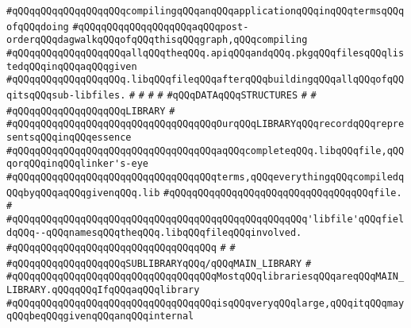 \verb|#qQQqqQQqqQQqqQQqqQQqcompilingqQQqanqQQqapplicationqQQqinqQQqtermsqQQqofqQQqdoing|\newline
\verb|#qQQqqQQqqQQqqQQqqQQqaqQQqpost-orderqQQqdagwalkqQQqofqQQqthisqQQqgraph,qQQqcompiling|\newline
\verb|#qQQqqQQqqQQqqQQqqQQqallqQQqtheqQQq.apiqQQqandqQQq.pkgqQQqfilesqQQqlistedqQQqinqQQqaqQQqgiven|\newline
\verb|#qQQqqQQqqQQqqQQqqQQq.libqQQqfileqQQqafterqQQqbuildingqQQqallqQQqofqQQqitsqQQqsub-libfiles.|\newline
\verb|#|\newline
\verb|#|\newline
\verb|#|\newline
\verb|#|\newline
\verb|#qQQqDATAqQQqSTRUCTURES|\newline
\verb|#|\newline
\verb|#|\newline
\verb|#qQQqqQQqqQQqqQQqqQQqLIBRARY|\newline
\verb|#|\newline
\verb|#qQQqqQQqqQQqqQQqqQQqqQQqqQQqqQQqqQQqOurqQQqLIBRARYqQQqrecordqQQqrepresentsqQQqinqQQqessence|\newline
\verb|#qQQqqQQqqQQqqQQqqQQqqQQqqQQqqQQqqQQqaqQQqcompleteqQQq.libqQQqfile,qQQqorqQQqinqQQqlinker's-eye|\newline
\verb|#qQQqqQQqqQQqqQQqqQQqqQQqqQQqqQQqqQQqterms,qQQqeverythingqQQqcompiledqQQqbyqQQqaqQQqgivenqQQq.lib|\newline
\verb|#qQQqqQQqqQQqqQQqqQQqqQQqqQQqqQQqqQQqfile.|\newline
\verb|#|\newline
\verb|#qQQqqQQqqQQqqQQqqQQqqQQqqQQqqQQqqQQqqQQqqQQqqQQqqQQq'libfile'qQQqfieldqQQq--qQQqnamesqQQqtheqQQq.libqQQqfileqQQqinvolved.|\newline
\verb|#qQQqqQQqqQQqqQQqqQQqqQQqqQQqqQQqqQQq|\newline
\verb|#|\newline
\verb|#|\newline
\verb|#qQQqqQQqqQQqqQQqqQQqSUBLIBRARYqQQq/qQQqMAIN_LIBRARY|\newline
\verb|#|\newline
\verb|#qQQqqQQqqQQqqQQqqQQqqQQqqQQqqQQqqQQqMostqQQqlibrariesqQQqareqQQqMAIN_LIBRARY.qQQqqQQqIfqQQqaqQQqlibrary|\newline
\verb|#qQQqqQQqqQQqqQQqqQQqqQQqqQQqqQQqqQQqisqQQqveryqQQqlarge,qQQqitqQQqmayqQQqbeqQQqgivenqQQqanqQQqinternal|\newline
